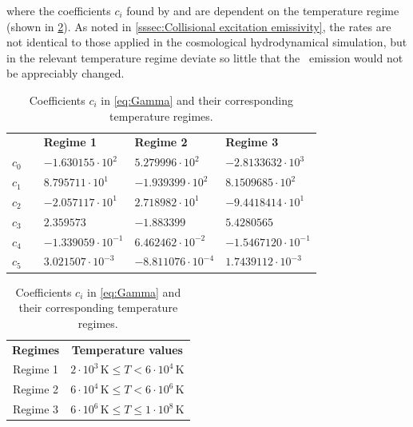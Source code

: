 \noindent where the coefficients $c_i$ found by \citet{1990MNRAS.242..692S} and \citet{1991ApJ...380..302S} are dependent on the temperature regime (shown in \cref{tab:Coefficients}). As noted in \cref{sssec:Collisional excitation emissivity}, the rates are not identical to those applied in the cosmological hydrodynamical simulation, but in the relevant temperature regime deviate so little that the \lya\ emission would not be appreciably changed.
\begin{table}
    \centering
    \caption[Coefficients $c_i$ in \cref{eq:Gamma}]{
        Coefficients $c_i$ in \cref{eq:Gamma} and their corresponding temperature regimes.
    }
    \begin{tabular}{c c l l l}
        
        & & \textbf{Regime 1}   & \textbf{Regime 2}     & \textbf{Regime 3} \\
        
        $c_0$ & & $-1.630155 \cdot 10^{2}$      & $5.279996 \cdot 10^{2}$ & $-2.8133632 \cdot 10^{3}$ \\
        
        $c_1$ & & $8.795711 \cdot 10^{1}$       & $-1.939399 \cdot 10^{2}$ & $8.1509685 \cdot 10^{2}$ \\
        
        $c_2$ & & $-2.057117 \cdot 10^{1}$      & $2.718982 \cdot 10^{1}$ & $-9.4418414 \cdot 10^{1}$ \\
        
        $c_3$ & & $2.359573$                            & $-1.883399$                           & $5.4280565$ \\
        
        $c_4$ & & $-1.339059 \cdot 10^{-1}$     & $6.462462 \cdot 10^{-2}$        & $-1.5467120 \cdot 10^{-1}$ \\
        
        $c_5$ & & $3.021507 \cdot 10^{-3}$      & $-8.811076 \cdot 10^{-4}$        & $1.7439112 \cdot 10^{-3}$ \\
    \end{tabular}
    
    \vspace{0.5ex}
    
    \begin{tabular}{c c}
        
        \textbf{Regimes}        & \textbf{Temperature values} \\
        
        Regime 1        & $2 \cdot 10^3 \, \mathrm{K} \leq T < 6 \cdot 10^4 \, \mathrm{K}$ \\
        
        Regime 2        & $6 \cdot 10^4 \, \mathrm{K} \leq T < 6 \cdot 10^6 \, \mathrm{K}$ \\
        
        Regime 3        & $6 \cdot 10^6 \, \mathrm{K} \leq T \leq 1 \cdot 10^8 \, \mathrm{K}$ \\
    \end{tabular}
    \label{tab:Coefficients}
\end{table}


